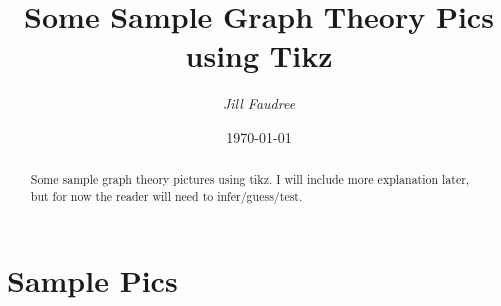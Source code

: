 \documentclass[12pt]{amsart}
\begin{document}
\title{Some Sample Graph Theory Pics using Tikz}
\date{\today}

\author[J. Faudree] {{\sl Jill Faudree} }
\address{Department of Mathematics and Statistics, University of Alaska Fairbanks, Fairbanks, AK 99775-6660}





\begin{abstract}
Some sample graph theory pictures using tikz. I will include more explanation later, but for now the reader will need to infer/guess/test.\end{abstract}
\maketitle


\section{Sample Pics}
\end{document}
